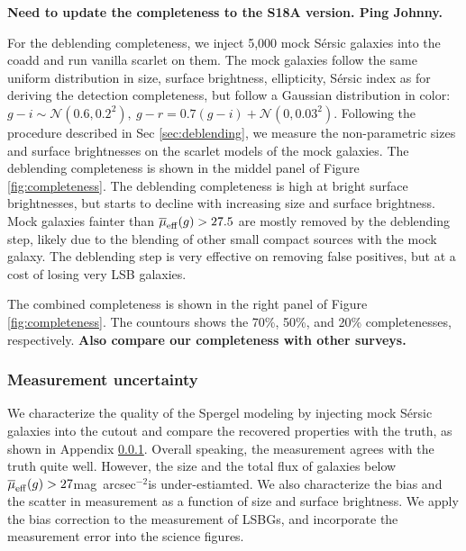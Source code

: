 \documentclass[twocolumn,astrosymb,twocolappendix]{aastex631}
\newcommand{\sbunit}{mag~arcsec$^{-2}$}
\newcommand{\sersic}{S\'ersic}
\begin{document}
\begin{CJK*}{UTF8}{gbsn}
\textbf{Need to update the completeness to the S18A version. Ping Johnny.}

For the deblending completeness, we inject 5,000 mock \sersic{} galaxies into the coadd and run vanilla scarlet on them. The mock galaxies follow the same uniform distribution in size, surface brightness, ellipticity, \sersic{} index as for deriving the detection completeness, but follow a Gaussian distribution in color: $g-i \sim \mathcal{N}(0.6, 0.2^2),\ g-r = 0.7 (g-i) + \mathcal{N}(0, 0.03^2)$. Following the procedure described in Sec \ref{sec:deblending}, we measure the non-parametric sizes and surface brightnesses on the scarlet models of the mock galaxies. The deblending completeness is shown in the middel panel of Figure \ref{fig:completeness}. The deblending completeness is high at bright surface brightnesses, but starts to decline with increasing size and surface brightness. Mock galaxies fainter than $\overline{\mu}_{\rm eff}(g) > 27.5$ are mostly removed by the deblending step, likely due to the blending of other small compact sources with the mock galaxy. The deblending step is very effective on removing false positives, but at a cost of losing very LSB galaxies. 

The combined completeness is shown in the right panel of Figure \ref{fig:completeness}. The countours shows the 70\%, 50\%, and 20\% completenesses, respectively. \textbf{Also compare our completeness with other surveys.}


\subsubsection{Measurement uncertainty}\label{sec:meas_unc}
We characterize the quality of the Spergel modeling by injecting mock \sersic{} galaxies into the cutout and compare the recovered properties with the truth, as shown in Appendix \ref{sec:meas_unc}. Overall speaking, the measurement agrees with the truth quite well. However, the size and the total flux of galaxies below $\overline{\mu}_{\rm eff} (g) > 27$\sbunit is under-estiamted. We also characterize the bias and the scatter in measurement as a function of size and surface brightness. We apply the bias correction to the measurement of LSBGs, and incorporate the measurement error into the science figures. 


\end{CJK*}
\end{document}
